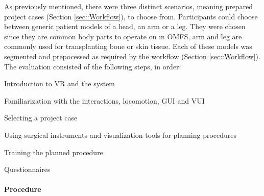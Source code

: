 As previously mentioned, there were three distinct scenarios, meaning prepared project cases (Section \ref{sec::Workflow}), to choose from.
Participants could choose between generic patient models of a head, an arm or a leg.
They were chosen since they are common body parts to operate on in OMFS, arm and leg are commonly used for transplanting bone or skin tissue.
Each of these models was segmented and prepocessed as required by the workflow (Section \ref{sec::Workflow}).
The evaluation consisted of the following steps, in order:

\begin{compactenum}[label=(\alph*)]
    \item Introduction to VR and the system
    \item Familiarization with the interactions, locomotion, GUI and VUI
    \item Selecting a project case
    \item Using surgical instruments and visualization tools for planning procedures
    \item Training the planned procedure 
    \item Questionnaires
\end{compactenum}

\paragraph{\textbf{Procedure}}

